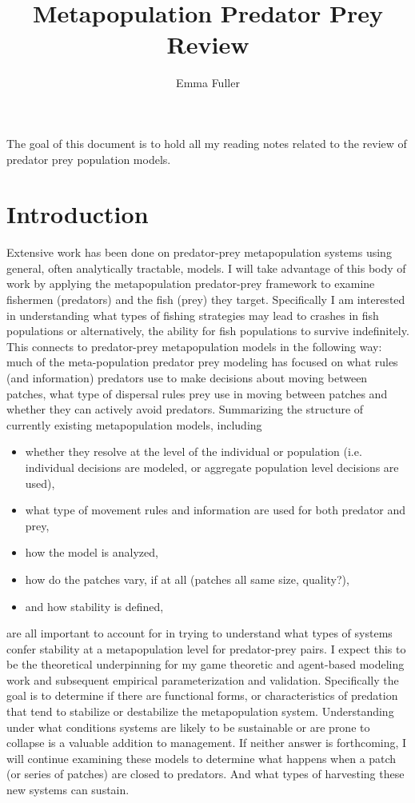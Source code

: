 \documentclass[12pt, a4paper]{article}
\title{Metapopulation Predator Prey Review}
\author{Emma Fuller}
\date{} 	%
\begin{document}
\maketitle

\noindent The goal of this document is to hold all my reading notes related to the review of predator prey population models. 


\tableofcontents

\section{Introduction}
Extensive work has been done on predator-prey metapopulation systems using general, often analytically tractable, models. I will take advantage of this body of work by applying the metapopulation predator-prey framework to examine fishermen (predators) and the fish (prey) they target. Specifically I am interested in understanding what types of fishing strategies may lead to crashes in fish populations or alternatively, the ability for fish populations to survive indefinitely. This connects to predator-prey metapopulation models in the following way: much of the meta-population predator prey modeling has focused on what rules (and information) predators use to make decisions about moving between patches, what type of dispersal rules prey use in moving between patches and whether they can actively avoid predators. Summarizing the structure of currently existing metapopulation models, including 

\begin{itemize}
\item whether they resolve at the level of the individual or population (i.e. individual decisions are modeled, or aggregate population level decisions are used), 
\item what type of movement rules and information are used for both predator and prey, 
\item how the model is analyzed,
\item how do the patches vary, if at all (patches all same size, quality?),
\item and how stability is defined, 
\end{itemize}

\noindent are all important to account for in trying to understand what types of systems confer stability at a metapopulation level for predator-prey pairs. I expect this to be the theoretical underpinning for my game theoretic  and agent-based modeling work and subsequent empirical parameterization and validation. Specifically the goal is to determine if there are functional forms, or characteristics of predation that tend to stabilize or destabilize the metapopulation system. Understanding under what conditions systems are likely to be sustainable or are prone to collapse is a valuable addition to management. If neither answer is forthcoming, I will continue examining these models to determine what happens when a patch (or series of patches) are closed to predators. And what types of harvesting these new systems can sustain. 
\end{document}
